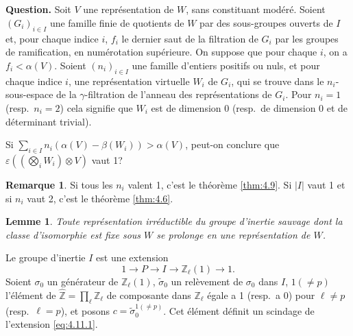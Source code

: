 \documentclass[12pt,a4paper]{article}
\theoremstyle{plain}
\newtheorem{lemma}[theorem]{Lemme}
\theoremstyle{definition}
\newtheorem{remark}[theorem]{Remarque}
\theoremstyle{remark}
\newcommand{\bZ}{\mathbb{Z}}
\begin{document}
\subsection{}
\label{sec:4.10}

\textbf{Question.} Soit $V$ une repr\'esentation de $W$, sans constituant mod\'er\'e. Soient $(G_i)_{i \in I}$ une famille finie de quotients de $W$ par des sous-groupes ouverts de $I$ et, pour chaque indice $i$, $f_i$ le dernier saut de la filtration de $G_i$ par les groupes de ramification, en num\'erotation sup\'erieure. On suppose que pour chaque $i$, on a $f_i < \alpha(V)$. Soient $(n_i)_{i \in I}$ une famille d'entiers positifs ou nuls, et pour chaque indice $i$, une repr\'esentation virtuelle $W_i$ de $G_i$, qui se trouve dans le $n_i$-sous-espace de la $\gamma$-filtration de l'anneau des repr\'esentations de $G_i$. Pour $n_i = 1$ (resp.~$n_i = 2$) cela signifie que $W_i$ est de dimension 0 (resp.~de dimension 0 et de d\'eterminant trivial).

Si $\sum_{i \in I} n_i(\alpha(V) - \beta(W_i)) > \alpha(V)$, peut-on conclure que $\varepsilon((\bigotimes_i W_i) \otimes V)$ vaut 1?

\begin{remark}
Si tous les $n_i$ valent 1, c'est le th\'eor\`eme \ref{thm:4.9}. Si $|I|$ vaut 1 et si $n_i$ vaut 2, c'est le th\'eor\`eme \ref{thm:4.6}.
\end{remark}

\begin{lemma}\label{lem:4.11}
Toute repr\'esentation irr\'eductible du groupe d'inertie sauvage dont la classe d'isomorphie est fixe sous $W$ se prolonge en une repr\'esentation de $W$.
\end{lemma}

Le groupe d'inertie $I$ est une extension
\begin{equation}\label{eq:4.11.1}
1 \to P \to I \to \bZ_\ell(1) \to 1.
\end{equation}
Soient $\sigma_0$ un g\'en\'erateur de $\bZ_\ell(1)$, $\tilde{\sigma}_0$ un rel\`evement de $\sigma_0$ dans $I$, $1(\neq p)$ l'\'el\'ement de $\hat{\bZ} = \prod_\ell \bZ_\ell$ de composante dans $\bZ_\ell$ \'egale a 1 (resp.~a 0) pour $\ell \neq p$ (resp.~$\ell = p$), et posons $c = \tilde{\sigma}_0^{1(\neq p)}$. Cet \'el\'ement d\'efinit un scindage de l'extension \eqref{eq:4.11.1}.
\end{document}
